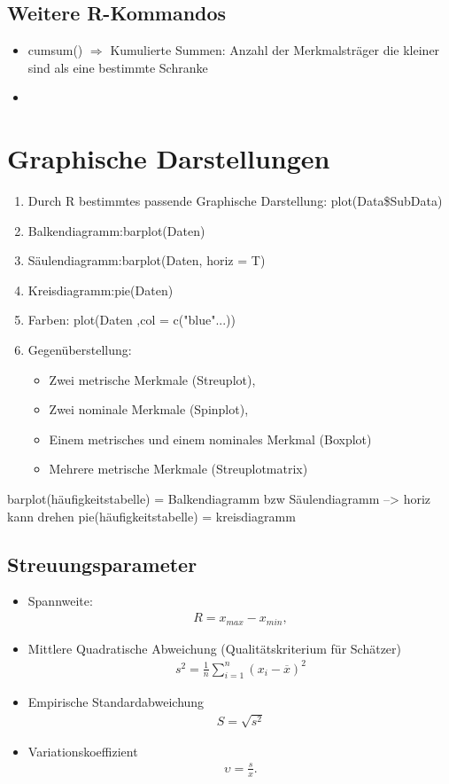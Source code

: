 \documentclass[a4paper,10pt]{scrartcl}
\begin{document}
\subsection{Weitere R-Kommandos}
\begin{itemize}
    \item cumsum() $\Rightarrow$ Kumulierte Summen:\newline 
    Anzahl der Merkmalsträger die kleiner sind als eine bestimmte Schranke
    \item 
    \end{itemize}
\newpage
\section{Graphische Darstellungen}
\begin{enumerate}
    \item Durch R bestimmtes passende Graphische Darstellung: plot(Data\$SubData)
    \item Balkendiagramm:barplot(Daten)
    \item Säulendiagramm:barplot(Daten, horiz = T)
    \item Kreisdiagramm:pie(Daten)
    \item Farben: plot(Daten ,col = c("blue"...))
    \item Gegenüberstellung:
    \begin{itemize}
        \item Zwei metrische Merkmale (Streuplot), 
        \item Zwei nominale Merkmale (Spinplot), 
        \item Einem metrisches und einem nominales Merkmal (Boxplot)
        \item Mehrere metrische Merkmale (Streuplotmatrix)
    \end{itemize}
\end{enumerate}
barplot(häufigkeitstabelle) = Balkendiagramm bzw Säulendiagramm --> horiz kann drehen
pie(häufigkeitstabelle) = kreisdiagramm

\subsection{Streuungsparameter}

\begin{itemize}
    \item Spannweite:\begin{eqnarray*}R={x}_{max}-{x}_{min},\end{eqnarray*}
    \item Mittlere Quadratische Abweichung (Qualitätskriterium für Schätzer)
    \begin{eqnarray*}{s}^{2}=\frac{1}{n}\displaystyle \sum_{i=1}^{n}{({x}_{i}-\overline{x})}^{2}\end{eqnarray*}
    \item Empirische Standardabweichung 
    \begin{eqnarray*}
    S = \sqrt{{s}^{2}}
    \end{eqnarray*}
    \item Variationskoeffizient 
    \begin{eqnarray*}\upsilon =\frac{s}{x}.\end{eqnarray*}
\end{itemize}
\newpage
\end{document}
